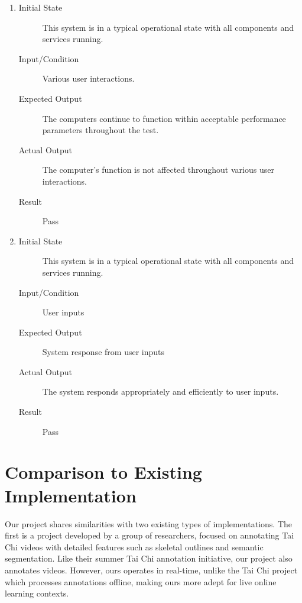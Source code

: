 \documentclass[12pt, titlepage]{article}
\begin{document}
\begin{enumerate}[NFR-T1]
  \item \label{NFRT29}
    \begin{description}
    \item[Initial State] This system is in a typical operational state with all
      components and services running.
    \item[Input/Condition] Various user interactions.
    \item[Expected Output] The computers continue to function within acceptable
      performance parameters throughout the test.
    \item[Actual Output] The computer's function is not affected throughout various
      user interactions.
    \item[Result] Pass
    \end{description}
  \item \label{NFRT30}
    \begin{description}
    \item[Initial State] This system is in a typical operational state with all
      components and services running.
    \item[Input/Condition] User inputs
    \item[Expected Output] System response from user inputs
    \item[Actual Output] The system responds appropriately and efficiently to user
      inputs.
    \item[Result] Pass
    \end{description}
  \end{enumerate}

\section{Comparison to Existing Implementation}

Our project shares similarities with two existing types of implementations. The
first is a project developed by a group of researchers, focused on annotating
Tai Chi videos with detailed features such as skeletal outlines and semantic
segmentation. Like their summer Tai Chi annotation initiative, our project also
annotates videos. However, ours operates in real-time, unlike the Tai Chi
project which processes annotations offline, making ours more adept for live
online learning contexts.
\end{document}

